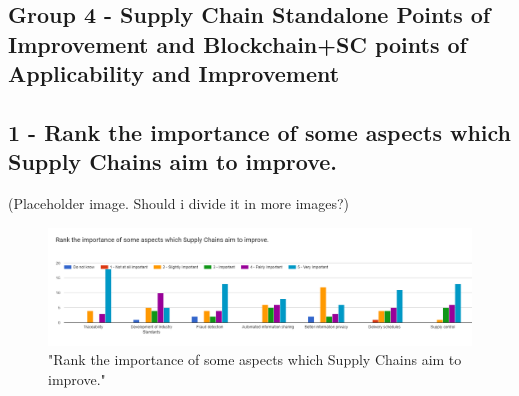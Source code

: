 
\subsection{Group 4 - Supply Chain Standalone Points of Improvement and Blockchain+SC points of Applicability and Improvement}




\subsection*{1 - Rank the importance of some aspects which Supply Chains aim to improve.}
 
(Placeholder image. Should i divide it in more images?)


\begin{figure}[h]
\centering
\includegraphics[scale=0.35]{media/importance_SC_improvement_points.png}
\caption["Rank the importance of some aspects which Supply Chains aim to improve."]{"Rank the importance of some aspects which Supply Chains aim to improve."}
\label{fig:importance_SC_improvement_points}
\end{figure}


